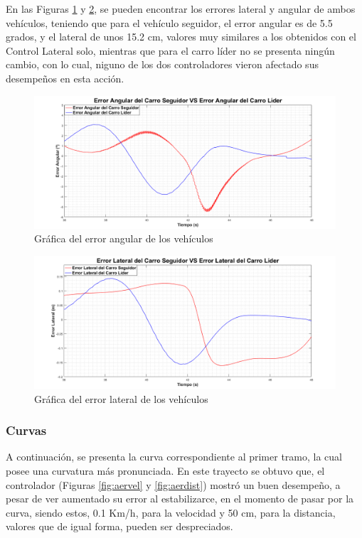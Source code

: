 \par En las Figuras \ref{fig:aerang} y \ref{fig:aerlat}, se pueden encontrar los errores lateral y angular de ambos vehículos, teniendo que para el vehículo seguidor, el error angular es de 5.5 grados, y el lateral de unos 15.2 cm, valores muy similares a los obtenidos con el Control Lateral solo, mientras que para el carro líder no se presenta ningún cambio, con lo cual, niguno de los dos controladores vieron afectado sus desempeños en esta acción.

\begin{figure}[H]
	\centering
		\includegraphics[scale=0.34]{Imagenes/accea}
		\caption{Gráfica del error angular de los vehículos}
		\label{fig:aerang}
\end{figure}	

\begin{figure}[H]
	\centering
		\includegraphics[scale=0.35]{Imagenes/accel}
		\caption{Gráfica del error lateral de los vehículos}
		\label{fig:aerlat}
\end{figure}	



\subsubsection{Curvas}
A continuación, se presenta la curva correspondiente al primer tramo, la cual posee una curvatura más pronunciada. En este trayecto se obtuvo que, el controlador (Figuras \ref{fig:aervel} y \ref{fig:aerdist}) mostró un buen desempeño, a pesar de ver aumentado su error al estabilizarce, en el momento de pasar por la curva, siendo estos, 0.1 Km/h, para la velocidad y 50 cm, para la distancia, valores que de igual forma, pueden ser despreciados. \\

